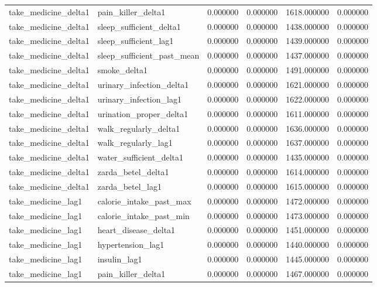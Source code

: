 \begin{longtable}{llrrrr}
take\_medicine\_delta1 & pain\_killer\_delta1 & 0.000000 & 0.000000 & 1618.000000 & 0.000000 \\
take\_medicine\_delta1 & sleep\_sufficient\_delta1 & 0.000000 & 0.000000 & 1438.000000 & 0.000000 \\
take\_medicine\_delta1 & sleep\_sufficient\_lag1 & 0.000000 & 0.000000 & 1439.000000 & 0.000000 \\
take\_medicine\_delta1 & sleep\_sufficient\_past\_mean & 0.000000 & 0.000000 & 1437.000000 & 0.000000 \\
take\_medicine\_delta1 & smoke\_delta1 & 0.000000 & 0.000000 & 1491.000000 & 0.000000 \\
take\_medicine\_delta1 & urinary\_infection\_delta1 & 0.000000 & 0.000000 & 1621.000000 & 0.000000 \\
take\_medicine\_delta1 & urinary\_infection\_lag1 & 0.000000 & 0.000000 & 1622.000000 & 0.000000 \\
take\_medicine\_delta1 & urination\_proper\_delta1 & 0.000000 & 0.000000 & 1611.000000 & 0.000000 \\
take\_medicine\_delta1 & walk\_regularly\_delta1 & 0.000000 & 0.000000 & 1636.000000 & 0.000000 \\
take\_medicine\_delta1 & walk\_regularly\_lag1 & 0.000000 & 0.000000 & 1637.000000 & 0.000000 \\
take\_medicine\_delta1 & water\_sufficient\_delta1 & 0.000000 & 0.000000 & 1435.000000 & 0.000000 \\
take\_medicine\_delta1 & zarda\_betel\_delta1 & 0.000000 & 0.000000 & 1614.000000 & 0.000000 \\
take\_medicine\_delta1 & zarda\_betel\_lag1 & 0.000000 & 0.000000 & 1615.000000 & 0.000000 \\
take\_medicine\_lag1 & calorie\_intake\_past\_max & 0.000000 & 0.000000 & 1472.000000 & 0.000000 \\
take\_medicine\_lag1 & calorie\_intake\_past\_min & 0.000000 & 0.000000 & 1473.000000 & 0.000000 \\
take\_medicine\_lag1 & heart\_disease\_delta1 & 0.000000 & 0.000000 & 1451.000000 & 0.000000 \\
take\_medicine\_lag1 & hypertension\_lag1 & 0.000000 & 0.000000 & 1440.000000 & 0.000000 \\
take\_medicine\_lag1 & insulin\_lag1 & 0.000000 & 0.000000 & 1445.000000 & 0.000000 \\
take\_medicine\_lag1 & pain\_killer\_delta1 & 0.000000 & 0.000000 & 1467.000000 & 0.000000 \\

\end{longtable}
